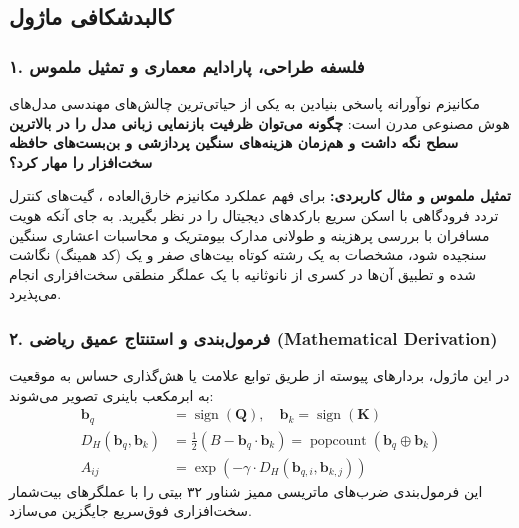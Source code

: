 \subsection{کالبدشکافی ماژول }

\subsubsection*{۱. فلسفه طراحی، پارادایم معماری و تمثیل ملموس}
مکانیزم نوآورانه  پاسخی بنیادین به یکی از حیاتی‌ترین چالش‌های مهندسی مدل‌های هوش مصنوعی مدرن است: \textbf{چگونه می‌توان ظرفیت بازنمایی زبانی مدل را در بالاترین سطح نگه داشت و هم‌زمان هزینه‌های سنگین پردازشی و بن‌بست‌های حافظه سخت‌افزار را مهار کرد؟}

\textbf{تمثیل ملموس و مثال کاربردی:}
برای فهم عملکرد مکانیزم خارق‌العاده ، گیت‌های کنترل تردد فرودگاهی با اسکن سریع بارکدهای دیجیتال را در نظر بگیرید. به جای آنکه هویت مسافران با بررسی پرهزینه و طولانی مدارک بیومتریک و محاسبات اعشاری سنگین سنجیده شود، مشخصات به یک رشته کوتاه بیت‌های صفر و یک (کد همینگ) نگاشت شده و تطبیق آن‌ها در کسری از نانوثانیه با یک عملگر منطقی  سخت‌افزاری انجام می‌پذیرد.

\subsubsection*{۲. فرمول‌بندی و استنتاج عمیق ریاضی (Mathematical Derivation)}
در این ماژول، بردارهای پیوسته از طریق توابع علامت یا هش‌گذاری حساس به موقعیت به ابرمکعب باینری تصویر می‌شوند:
\begin{align}
\mathbf{b}_q &= \operatorname{sign}(\mathbf{Q}), \quad \mathbf{b}_k = \operatorname{sign}(\mathbf{K}) \\
D_H(\mathbf{b}_q, \mathbf{b}_k) &= \frac{1}{2}\left(B - \mathbf{b}_q \cdot \mathbf{b}_k\right) = \operatorname{popcount}(\mathbf{b}_q \oplus \mathbf{b}_k) \\
A_{ij} &= \exp\left(-\gamma \cdot D_H(\mathbf{b}_{q,i}, \mathbf{b}_{k,j})\right)
\end{align}
این فرمول‌بندی ضرب‌های ماتریسی ممیز شناور ۳۲ بیتی را با عملگرهای بیت‌شمار سخت‌افزاری فوق‌سریع جایگزین می‌سازد.

